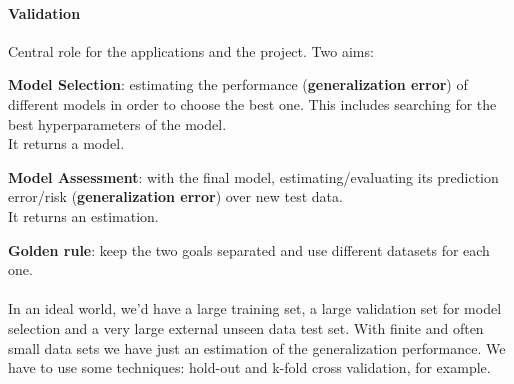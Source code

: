 \documentclass[10pt]{report}
\begin{document}
\paragraph{Validation} Central role for the applications and the project. Two aims:
\begin{list}{}{}
	\item \textbf{Model Selection}: estimating the performance (\textbf{generalization error}) of different models in order to choose the best one. This includes searching for the best hyperparameters of the model.\\
	It returns a model.
	\item \textbf{Model Assessment}: with the final model, estimating/evaluating its prediction error/risk (\textbf{generalization error}) over new test data.\\
	It returns an estimation.
\end{list}
\textbf{Golden rule}: keep the two goals separated and use different datasets for each one.\\\\
In an ideal world, we'd have a large training set, a large validation set for model selection and a very large external unseen data test set. With finite and often small data sets we have just an estimation of the generalization performance. We have to use some techniques: hold-out and k-fold cross validation, for example.
\end{document}
